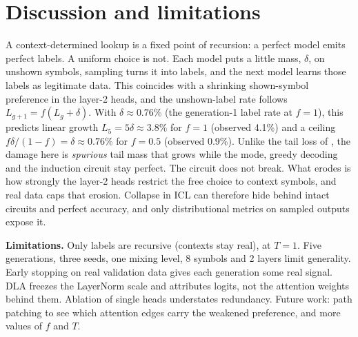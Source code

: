 \documentclass[10pt,a4paper]{article}
\begin{document}
\section{Discussion and limitations}
A context-determined lookup is a fixed point of recursion: a perfect model emits perfect labels. A uniform choice is not. Each model puts a little mass, $\delta$, on unshown symbols, sampling turns it into labels, and the next model learns those labels as legitimate data. This coincides with a shrinking shown-symbol preference in the layer-2 heads, and the unshown-label rate follows $L_{g+1}=f(L_g+\delta)$. With $\delta\approx0.76\%$ (the generation-1 label rate at $f{=}1$), this predicts linear growth $L_5=5\delta\approx3.8\%$ for $f{=}1$ (observed 4.1\%) and a ceiling $f\delta/(1-f)=\delta\approx0.76\%$ for $f{=}0.5$ (observed 0.9\%). Unlike the tail loss of \citep{shumailov2024}, the damage here is \emph{spurious} tail mass that grows while the mode, greedy decoding and the induction circuit stay perfect. The circuit does not break. What erodes is how strongly the layer-2 heads restrict the free choice to context symbols, and real data caps that erosion. Collapse in ICL can therefore hide behind intact circuits and perfect accuracy, and only distributional metrics on sampled outputs expose it.

\textbf{Limitations.} Only labels are recursive (contexts stay real), at $T{=}1$. Five generations, three seeds, one mixing level, 8 symbols and 2 layers limit generality. Early stopping on real validation data gives each generation some real signal. DLA freezes the LayerNorm scale and attributes logits, not the attention weights behind them. Ablation of single heads understates redundancy. Future work: path patching to see which attention edges carry the weakened preference, and more values of $f$ and $T$.
\end{document}
